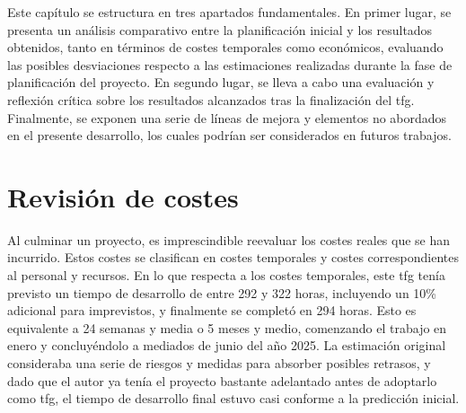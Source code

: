 
Este capítulo se estructura en tres apartados fundamentales. En primer lugar, se presenta un análisis comparativo entre la planificación inicial y los resultados obtenidos, tanto en términos de costes temporales como económicos, evaluando las posibles desviaciones respecto a las estimaciones realizadas durante la fase de planificación del proyecto. En segundo lugar, se lleva a cabo una evaluación y reflexión crítica sobre los resultados alcanzados tras la finalización del \gls{tfg}. Finalmente, se exponen una serie de líneas de mejora y elementos no abordados en el presente desarrollo, los cuales podrían ser considerados en futuros trabajos.

\section{Revisión de costes}

Al culminar un proyecto, es imprescindible reevaluar los costes reales que se han incurrido. Estos costes se clasifican en costes temporales y costes correspondientes al personal y recursos. En lo que respecta a los costes temporales, este \gls{tfg} tenía previsto un tiempo de desarrollo de entre 292 y 322 horas, incluyendo un 10\% adicional para imprevistos, y finalmente se completó en 294 horas. Esto es equivalente a 24 semanas y media o 5 meses y medio, comenzando el trabajo en enero y concluyéndolo a mediados de junio del año 2025. La estimación original consideraba una serie de riesgos y medidas para absorber posibles retrasos, y dado que el autor ya tenía el proyecto bastante adelantado antes de adoptarlo como \gls{tfg}, el tiempo de desarrollo final estuvo casi conforme a la predicción inicial.

